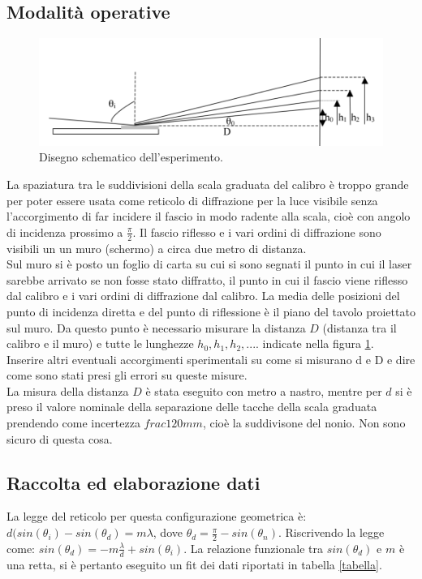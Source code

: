 \documentclass[10pt,a4paper]{article}
\begin{document}
\subsection{Modalità operative}
\begin{figure}[!htb]
  \centering
  \includegraphics[scale=.5]{disegno1.png}
\caption{Disegno schematico dell'esperimento.}
\label{parteAfigura}
\end{figure}
La spaziatura tra le suddivisioni della scala graduata del calibro è troppo grande per poter essere usata come reticolo di diffrazione per la luce visibile senza l'accorgimento di far incidere il fascio in modo radente alla scala, cioè con angolo di incidenza prossimo a $\frac{\pi}{2}$. Il fascio riflesso e i vari ordini di diffrazione sono visibili un un muro (schermo) a circa due metro di distanza.\\
Sul muro si è posto un foglio di carta su cui si sono segnati il punto in cui il laser sarebbe arrivato se non fosse stato diffratto, il punto in cui il fascio viene riflesso dal calibro e i vari ordini di diffrazione dal calibro. La media delle posizioni del punto di incidenza diretta e del punto di riflessione è il piano del tavolo proiettato sul muro. Da questo punto è necessario misurare la distanza $D$ (distanza tra il calibro e il muro) e tutte le lunghezze $h_0, h_1, h_2,...$. indicate nella figura \ref{parteAfigura}.\\
Inserire altri eventuali accorgimenti sperimentali su come si misurano d e D e dire come sono stati presi gli errori su queste misure.\\
La misura della distanza $D$ è stata eseguito con metro a nastro, mentre per $d$ si è preso il valore nominale della separazione delle tacche della scala graduata prendendo come incertezza $frac{1}{20} mm$, cioè la suddivisone del nonio. Non sono sicuro di questa cosa.\\
\subsection{Raccolta ed elaborazione dati}
La legge del reticolo per questa configurazione geometrica è: $d(sin(\theta_i)-sin(\theta_d) = m \lambda $, dove $\theta_d = \frac{\pi}{2} - sin(\theta_n)$. Riscrivendo la legge come: $sin(\theta_d) = -m \frac{\lambda}{d} +sin(\theta_i)$. La relazione funzionale tra $sin(\theta_d)$ e $m$ è una retta, si è pertanto eseguito un fit dei dati riportati in tabella \ref{tabella}.
\end{document}

